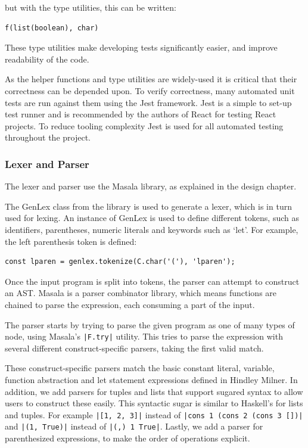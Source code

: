 \documentclass[a4paper,fleqn,12pt]{article}
\begin{document}
but with the type utilities, this can be written:

\begin{verbatim}
f(list(boolean), char)
\end{verbatim}

These type utilities make developing tests significantly easier, and improve readability of the code.

As the helper functions and type utilities are widely-used it is critical that their correctness can be depended upon. To verify correctness, many automated unit tests are run against them using the Jest framework. Jest is a simple to set-up test runner and is recommended by the authors of React for testing React projects. To reduce tooling complexity Jest is used for all automated testing throughout the project.
\subsubsection{Lexer and Parser}\label{id:h.qbtwwllp8tw6}
The lexer and parser use the Masala library, as explained in the design chapter.

The GenLex class from the library is used to generate a lexer, which is in turn used for lexing. An instance of GenLex is used to define different tokens, such as identifiers, parentheses, numeric literals and keywords such as ‘let’. For example, the left parenthesis token is defined:

\begin{verbatim}
const lparen = genlex.tokenize(C.char('('), 'lparen');
\end{verbatim}

Once the input program is split into tokens, the parser can attempt to construct an AST. Masala is a parser combinator library, which means functions are chained to parse the expression, each consuming a part of the input.

The parser starts by trying to parse the given program as one of many types of node, using Masala’s \texttt{|F.try|} utility. This tries to parse the expression with several different construct-specific parsers, taking the first valid match.

These construct-specific parsers match the basic constant literal, variable, function abstraction and let statement expressions defined in Hindley Milner. In addition, we add parsers for tuples and lists that support sugared syntax to allow users to construct these easily. This syntactic sugar is similar to Haskell’s for lists and tuples. For example \texttt{|[1, 2, 3]|} instead of  \texttt{|cons 1 (cons 2 (cons 3 [])|} and \texttt{|(1, True)|} instead of \texttt{|(,) 1 True|}. Lastly, we add a parser for parenthesized expressions, to make the order of operations explicit.
\end{document}
